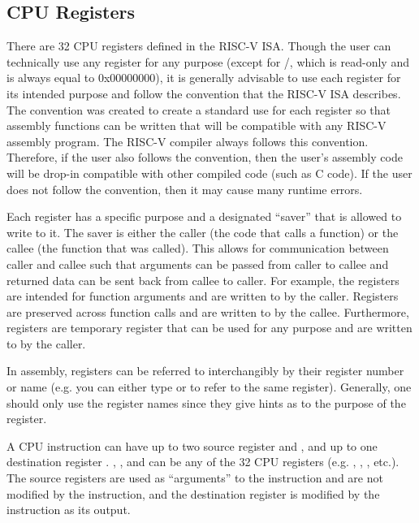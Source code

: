 \documentclass[11pt,pdftex,portrait,letterpaper]{article}
\begin{document}
\subsection{CPU Registers}

There are 32 CPU registers defined in the RISC-V ISA. Though the user can technically use any register for any purpose (except for /, which is read-only and is always equal to 0x00000000), it is generally advisable to use each register for its intended purpose and follow the convention that the RISC-V ISA describes. The convention was created to create a standard use for each register so that assembly functions can be written that will be compatible with any RISC-V assembly program. The RISC-V compiler always follows this convention. Therefore, if the user also follows the convention, then the user's assembly code will be drop-in compatible with other compiled code (such as C code). If the user does not follow the convention, then it may cause many runtime errors.

Each register has a specific purpose and a designated ``saver'' that is allowed to write to it. The saver is either the caller (the code that calls a function) or the callee (the function that was called). This allows for communication between caller and callee such that arguments can be passed from caller to callee and returned data can be sent back from callee to caller. For example, the registers  are intended for function arguments and are written to by the caller. Registers  are preserved across function calls and are written to by the callee. Furthermore, registers  are temporary register that can be used for any purpose and are written to by the caller.

In assembly, registers can be referred to interchangibly by their register number or name (e.g. you can either type  or  to refer to the same register). Generally, one should only use the register names since they give hints as to the purpose of the register.

A CPU instruction can have up to two source register  and , and up to one destination register . , , and  can be any of the 32 CPU registers (e.g. , , , etc.). The source registers are used as ``arguments'' to the instruction and are not modified by the instruction, and the destination register is modified by the instruction as its output. 
\end{document}
